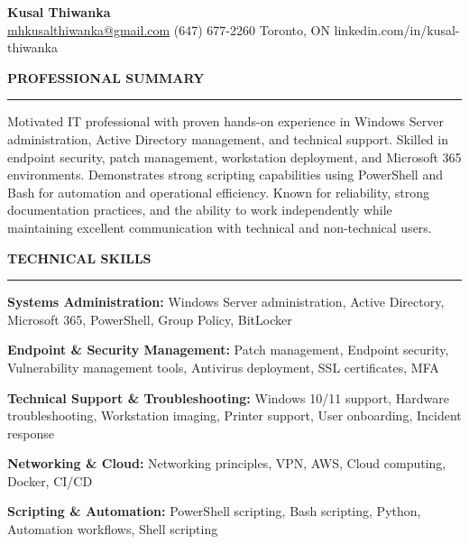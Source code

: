 \documentclass[10pt,letterpaper]{article}
\begin{document}
\begin{center}
{\LARGE\textbf{Kusal Thiwanka}}\\[3pt]
\href{mailto:mhkusalthiwanka@gmail.com}{mhkusalthiwanka@gmail.com}\hspace{2em}%
(647) 677{-}2260\hspace{2em}%
Toronto, ON\hspace{2em}
linkedin.com/in/kusal-thiwanka
\end{center}

\vspace{6pt}

\textbf{PROFESSIONAL SUMMARY}\\[-8pt]
\noindent\rule{\textwidth}{1pt}

\vspace{-2pt}

Motivated IT professional with proven hands-on experience in Windows Server administration, Active Directory management, and technical support. Skilled in endpoint security, patch management, workstation deployment, and Microsoft 365 environments. Demonstrates strong scripting capabilities using PowerShell and Bash for automation and operational efficiency. Known for reliability, strong documentation practices, and the ability to work independently while maintaining excellent communication with technical and non-technical users.

\vspace{8pt}

\textbf{TECHNICAL SKILLS}\\[-8pt]
\noindent\rule{\textwidth}{1pt}

\vspace{-2pt}

\textbf{Systems Administration:} Windows Server administration, Active Directory, Microsoft 365, PowerShell, Group Policy, BitLocker

\textbf{Endpoint \& Security Management:} Patch management, Endpoint security, Vulnerability management tools, Antivirus deployment, SSL certificates, MFA

\textbf{Technical Support \& Troubleshooting:} Windows 10/11 support, Hardware troubleshooting, Workstation imaging, Printer support, User onboarding, Incident response

\textbf{Networking \& Cloud:} Networking principles, VPN, AWS, Cloud computing, Docker, CI/CD

\textbf{Scripting \& Automation:} PowerShell scripting, Bash scripting, Python, Automation workflows, Shell scripting
\end{document}
